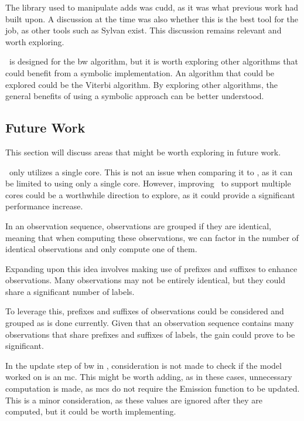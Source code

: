 The library used to manipulate \glspl{add} was \gls{cudd}, as it was what previous work had built upon.
A discussion at the time was also whether this is the best tool for the job, as other tools such as Sylvan exist.
This discussion remains relevant and worth exploring.

\Cupaal\ is designed for the \gls{bw} algorithm, but it is worth exploring other algorithms that could benefit from a symbolic implementation.
An algorithm that could be explored could be the Viterbi algorithm.
By exploring other algorithms, the general benefits of using a symbolic approach can be better understood.


\subsection{Future Work}\label{subsec:future_work}
This section will discuss areas that might be worth exploring in future work.

\Cupaal\ only utilizes a single core. This is not an issue when comparing it to \Jajapy, as it can be limited to using only a single core.
However, improving \Cupaal\ to support multiple cores could be a worthwhile direction to explore, as it could provide a significant performance increase.

In an observation sequence, observations are grouped if they are identical, meaning that when computing these observations, we can factor in the number of identical observations and only compute one of them.

Expanding upon this idea involves making use of prefixes and suffixes to enhance observations.
Many observations may not be entirely identical, but they could share a significant number of labels.

To leverage this, prefixes and suffixes of observations could be considered and grouped as is done currently.
Given that an observation sequence contains many observations that share prefixes and suffixes of labels, the gain could prove to be significant.

In the update step of \gls{bw} in \Cupaal, consideration is not made to check if the model worked on is an \gls{mc}.
This might be worth adding, as in these cases, unnecessary computation is made, as \glspl{mc} do not require the Emission function to be updated.
This is a minor consideration, as these values are ignored after they are computed, but it could be worth implementing.



